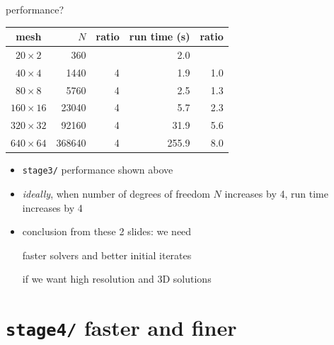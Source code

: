 \documentclass[10pt,hyperref,dvipsnames]{beamer}
\begin{document}
\begin{frame}{performance?}

\begin{center}
\begin{tabular}{c|rr|rr}
mesh           &   $N$ & ratio & run time (s)  & ratio \\ \hline
$20\times 2$   &    360 &       &          2.0 &       \\
$40\times 4$   &   1440 &     4 &          1.9 &   1.0 \\
$80\times 8$   &   5760 &     4 &          2.5 &   1.3 \\
$160\times 16$ &  23040 &     4 &          5.7 &   2.3 \\
$320\times 32$ &  92160 &     4 &         31.9 &   5.6 \\
$640\times 64$ & 368640 &     4 &        255.9 &   8.0
\end{tabular}
\end{center}

\begin{itemize}
\item \texttt{stage3/} performance shown above
\item \emph{ideally}, when number of degrees of freedom $N$ increases by 4, run time increases by 4
\item conclusion from these 2 slides: we need

\begin{center}
\alert{faster solvers} and \alert{better initial iterates}
\end{center}

if we want high resolution and 3D solutions
\end{itemize}
\end{frame}



\section{\texttt{stage4/} \qquad faster and finer}
\end{document}
